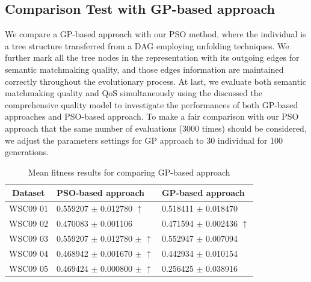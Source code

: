\documentclass{IEEEtran}
\begin{document}
\subsection{Comparison Test with GP-based approach}\label{comparisonTestWithGP}
We compare a GP-based approach  \cite{ma2015hybrid} with our PSO method, where the individual is a tree structure transferred from a DAG employing unfolding techniques. We further mark all the tree nodes in the representation with its outgoing edges for semantic matchmaking quality, and those edges information are maintained correctly throughout the evolutionary process. At last, we evaluate both semantic matchmaking quality and QoS simultaneously using the discussed the comprehensive quality model to investigate the performances of both GP-based approaches and PSO-based approach. To make a fair comparison with our PSO approach that the same number of evaluations (3000 times) should be considered, we adjust the parameters settings for GP approach \cite{ma2015hybrid} to 30 individual for 100 generations.
\begin{table}[]
\centering
\caption{Mean fitness results for comparing GP-based approach}
\label{meanFitness}
\begin{tabular}{l|l|l}
\hline
\multicolumn{1}{c|}{Dataset} & PSO-based approach & GP-based approach  \\ \hline
WSC09 01                     &0.559207 $\pm$ 0.012780 $\uparrow$      &0.518411 $\pm$ 0.018470               \\ \hline
WSC09 02                     &0.470083 $\pm$  0.001106   &0.471594 $\pm$  0.002436 $\uparrow$           \\ \hline
WSC09 03                     & 0.559207 $\pm$ 0.012780 $\pm$ $\uparrow$  &0.552947 $\pm$ 0.007094            \\ \hline
WSC09 04                     & 0.468942 $\pm$ 0.001670 $\pm$ $\uparrow$  &0.442934 $\pm$ 0.010154            \\ \hline
WSC09 05                     & 0.469424 $\pm$ 0.000800 $\pm$ $\uparrow$  &0.256425 $\pm$ 0.038916            \\ \hline
\end{tabular}
\end{table}
\end{document}
